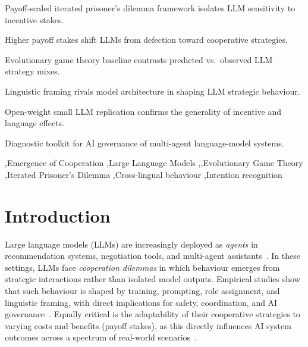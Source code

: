 \documentclass[a4paper,fleqn]{cas-sc}
\begin{document}
\begin{highlights}
\item Payoff-scaled iterated prisoner's dilemma framework isolates LLM sensitivity to incentive stakes.
\item Higher payoff stakes shift LLMs from defection toward cooperative strategies.
\item Evolutionary game theory baseline contrasts predicted vs.\ observed LLM strategy mixes.
\item Linguistic framing rivals model architecture in shaping LLM strategic behaviour.
\item Open-weight small LLM replication confirms the generality of incentive and language effects.
\item Diagnostic toolkit for AI governance of multi-agent language-model systems.
\end{highlights}

\begin{keywords}
\sep Emergence of Cooperation  \sep Large Language Models \sep \sep Evolutionary Game Theory  \sep Iterated Prisoner's Dilemma  \sep Cross-lingual behaviour \sep  Intention recognition
\end{keywords}

\maketitle


\section{Introduction}\label{sec:intro}


Large language models (LLMs) are increasingly deployed as \emph{agents} in recommendation systems, negotiation tools, and multi-agent assistants~\cite{tessler2024ai,hammond2025multi,cook2024llm}. In these settings, LLMs face \emph{cooperation dilemmas} in which behaviour emerges from strategic interactions rather than isolated model outputs. Empirical studies show that such behaviour is shaped by training, prompting, role assignment, and linguistic framing, with direct implications for safety, coordination, and AI governance~\cite{lu2024llms,akata2025,fontana2025nicer,han2026social,idowu2026mapping}. Equally critical is the adaptability of their cooperative strategies to varying costs and benefits (payoff stakes), as this directly influences AI system outcomes across a spectrum of real-world scenarios~\cite{hammond2025multi}.
\end{document}
